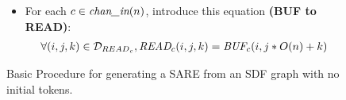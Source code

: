 \begin{figure}[t]
{\begin{minipage}{6.3in}
\begin{itemize}
\begin{align}
  \mt{WRITE}_{c}(i, q, j - q * U(c) \\ \nonumber
&\mt{where } {\cal D}_{SW {\small \rightarrow} SB}(c,q) = 
  {\cal D}_{{BUF}_{c}} \cap 
  \{ (i,j) | q*U(c) \le j \le (q+1)*U(c) - 1 \}
\end{align}
\item For each $c \in \mbox{\it chan\_in}(n)$, introduce this equation {\bf(BUF to
READ)}:
\begin{align}
\forall (i,j,k) \in {\cal D}_{{READ}_{c}},
\mbox{\it READ}_{c}(i,j,k) = \mbox{\it BUF}_{c}(i,j*O(n) + k)
\end{align}
\end{itemize}

\end{minipage}}
\caption{Basic Procedure for generating a SARE from an SDF graph with no initial tokens.
\protect\label{fig:sdftosare}}
\end{figure}





